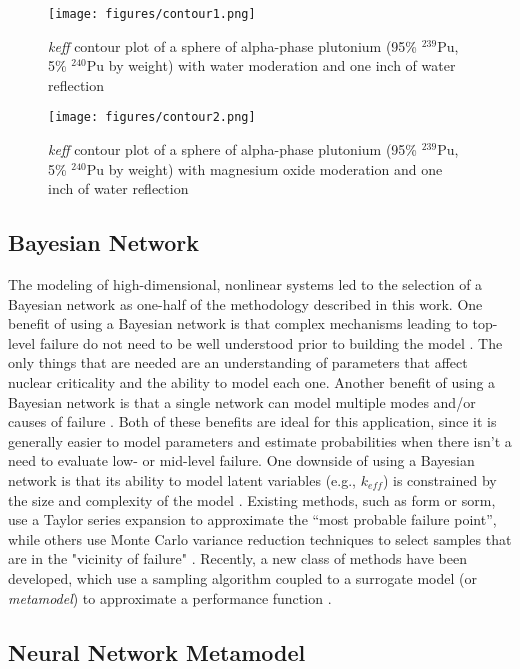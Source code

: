 \begin{figure}
  \centering
  \texttt{[image: figures/contour1.png]}
  \caption{\textit{keff} contour plot of a sphere of alpha-phase plutonium (95\% $^{239}$Pu, 5\% $^{240}$Pu by weight) with water moderation and one inch of water reflection}
  \label{fig:contour1}
  \vspace{+1.1cm}
  \texttt{[image: figures/contour2.png]}
  \caption{\textit{keff} contour plot of a sphere of alpha-phase plutonium (95\% $^{239}$Pu, 5\% $^{240}$Pu by weight) with magnesium oxide moderation and one inch of water reflection}
  \label{fig:contour2}
\end{figure}

\subsection{Bayesian Network}

The modeling of high-dimensional, nonlinear systems led to the selection of a Bayesian network \cite{pearl} as one-half of the methodology described in this work.
One benefit of using a Bayesian network is that complex mechanisms leading to top-level failure do not need to be well understood prior to building the model \cite{khakzad,pearl,scutari}.
The only things that are needed are an understanding of parameters that affect nuclear criticality \cite{knief} and the ability to model each one.
Another benefit of using a Bayesian network is that a single network can model multiple modes and/or causes of failure \cite{bobbio,tien}.
Both of these benefits are ideal for this application, since it is generally easier to model parameters and estimate probabilities when there isn't a need to evaluate low- or mid-level failure.
One downside of using a Bayesian network is that its ability to model latent variables (e.g., $k_{eff}$) is constrained by the size and complexity of the model \cite{koller,tien}.
Existing methods, such as \gls{form} or \gls{sorm}, use a Taylor series expansion to approximate the “most probable failure point”, while others use Monte Carlo variance reduction techniques to select samples that are in the "vicinity of failure" \cite{cadini2016}.
Recently, a new class of methods have been developed, which use a sampling algorithm coupled to a surrogate model (or \textit{metamodel}) to approximate a performance function \cite{cadini2016}.

\subsection{Neural Network Metamodel}

